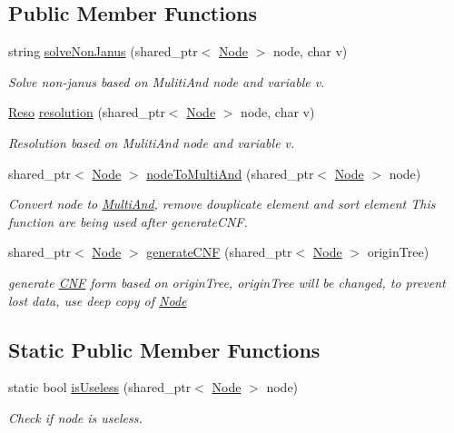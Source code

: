 \subsection*{Public Member Functions}
\begin{DoxyCompactItemize}
\item 
string \hyperlink{struct_i___c_n_f_aa7adb25b5dbb1f4dcddaf56dab338add}{solve\+Non\+Janus} (shared\+\_\+ptr$<$ \hyperlink{class_node}{Node} $>$ node, char v)
\begin{DoxyCompactList}\small\item\em Solve non-\/janus based on Muliti\+And node and variable v. \end{DoxyCompactList}\item 
\hyperlink{struct_reso}{Reso} \hyperlink{struct_i___c_n_f_a1b3282ebd2d998f5fe3aa3e192346ac1}{resolution} (shared\+\_\+ptr$<$ \hyperlink{class_node}{Node} $>$ node, char v)
\begin{DoxyCompactList}\small\item\em Resolution based on Muliti\+And node and variable v. \end{DoxyCompactList}\item 
shared\+\_\+ptr$<$ \hyperlink{class_node}{Node} $>$ \hyperlink{struct_i___c_n_f_ac0c5ce2bd3edadb60de923b4259cc10b}{node\+To\+Multi\+And} (shared\+\_\+ptr$<$ \hyperlink{class_node}{Node} $>$ node)
\begin{DoxyCompactList}\small\item\em Convert node to \hyperlink{class_multi_and}{Multi\+And}, remove douplicate element and sort element This function are being used after generate\+C\+NF. \end{DoxyCompactList}\item 
shared\+\_\+ptr$<$ \hyperlink{class_node}{Node} $>$ \hyperlink{struct_i___c_n_f_afedf64bb258fd48ea0f811a9f571f0f0}{generate\+C\+NF} (shared\+\_\+ptr$<$ \hyperlink{class_node}{Node} $>$ origin\+Tree)
\begin{DoxyCompactList}\small\item\em generate \hyperlink{class_c_n_f}{C\+NF} form based on origin\+Tree, origin\+Tree will be changed, to prevent lost data, use deep copy of \hyperlink{class_node}{Node} \end{DoxyCompactList}\end{DoxyCompactItemize}
\subsection*{Static Public Member Functions}
\begin{DoxyCompactItemize}
\item 
static bool \hyperlink{struct_i___c_n_f_ae9f978965edae4ab57c692544cb72d01}{is\+Useless} (shared\+\_\+ptr$<$ \hyperlink{class_node}{Node} $>$ node)
\begin{DoxyCompactList}\small\item\em Check if node is useless. \end{DoxyCompactList}\end{DoxyCompactItemize}
